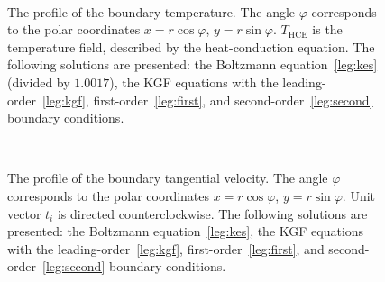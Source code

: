 \documentclass[10pt]{article}
\begin{document}
\begin{figure}
    \setcounter{subfigure}{0}
    \centering
    \\
    \caption{
        The profile of the boundary temperature. The angle \(\varphi\) corresponds
        to the polar coordinates \(x=r\cos\varphi\), \(y=r\sin\varphi\).
        \(T_{\mathrm{HCE}}\) is the temperature field, described by the heat-conduction equation.
        The following solutions are presented: the Boltzmann equation~\ref{leg:kes} (divided by \(1.0017\)),
        the KGF equations with the leading-order~\ref{leg:kgf}, first-order~\ref{leg:first},
        and second-order~\ref{leg:second} boundary conditions.
    }
    \label{fig:profile-temp}
\end{figure}

\begin{figure}
    \centering
    \\
    \caption{
        The profile of the boundary tangential velocity. The angle \(\varphi\) corresponds
        to the polar coordinates \(x=r\cos\varphi\), \(y=r\sin\varphi\).
        Unit vector \(t_i\) is directed counterclockwise.
        The following solutions are presented: the Boltzmann equation~\ref{leg:kes},
        the KGF equations with the leading-order~\ref{leg:kgf}, first-order~\ref{leg:first},
        and second-order~\ref{leg:second} boundary conditions.
    }
    \label{fig:profile-vel}
\end{figure}
\end{document}
